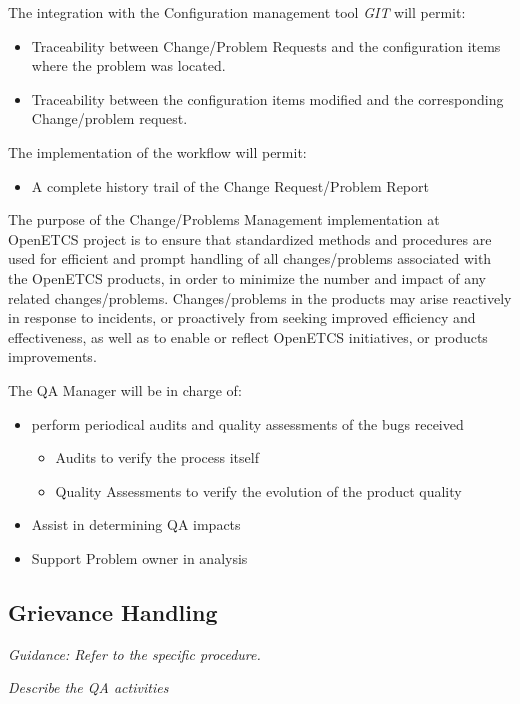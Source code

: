 \documentclass{template/openetcs_article}
\begin{document}
The integration with the Configuration management tool {\it GIT} will permit:
\begin{itemize}
\item Traceability between Change/Problem Requests and the configuration items where the problem was located.
\item Traceability between the configuration items modified and the corresponding Change/problem request. 
\end{itemize}
 
The implementation of the workflow will permit:
\begin{itemize}
\item A complete history trail of the Change Request/Problem Report
\end{itemize}

The purpose of the Change/Problems Management implementation at OpenETCS project is to ensure that standardized methods and procedures are used for efficient and prompt handling of all changes/problems associated with the OpenETCS products, in order to minimize the number and impact of any related changes/problems. Changes/problems in the products may arise reactively in response to incidents, or proactively from seeking improved efficiency and effectiveness, as well as to enable or reflect OpenETCS initiatives, or products improvements.

The QA Manager will be in charge of:
\begin{itemize}
\item perform periodical audits and quality assessments of the bugs received
\begin{itemize}
\item Audits to verify the process itself
\item Quality Assessments to verify the evolution of the product quality
\end{itemize}
\item Assist in determining QA impacts
\item Support Problem owner in analysis
\end{itemize}

\subsection{Grievance Handling}
\textit{Guidance: Refer to the specific procedure. }

\textit{Describe the QA activities}

\end{document}
